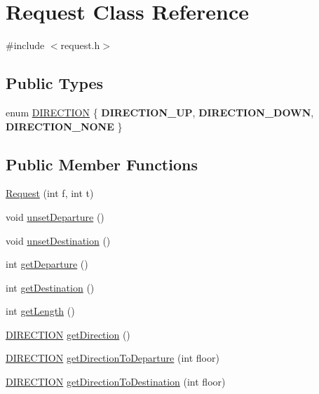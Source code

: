 \hypertarget{class_request}{
\section{Request Class Reference}
\label{class_request}
}


{\ttfamily \#include $<$request.h$>$}

\subsection*{Public Types}
\begin{DoxyCompactItemize}
\item 
enum \hyperlink{class_request_a31872cb7919df688dc6866ea607b9d9d}{DIRECTION} \{ {\bfseries DIRECTION\_\-UP}, 
{\bfseries DIRECTION\_\-DOWN}, 
{\bfseries DIRECTION\_\-NONE}
 \}
\end{DoxyCompactItemize}
\subsection*{Public Member Functions}
\begin{DoxyCompactItemize}
\item 
\hyperlink{class_request_a65d1a250d302018d1211fbdb2b8e0345}{Request} (int f, int t)
\item 
void \hyperlink{class_request_a76a1f5a44df4120828d34a90fbcec13e}{unsetDeparture} ()
\item 
void \hyperlink{class_request_addbd9fdcd5e5a0291c89aad38f6c8416}{unsetDestination} ()
\item 
int \hyperlink{class_request_a7199b71072973cac67be00225bd9ce5b}{getDeparture} ()
\item 
int \hyperlink{class_request_af8586495f2fd5dce9fc5690d47f59310}{getDestination} ()
\item 
int \hyperlink{class_request_a78b24de8cdef27ff340b28d49d251720}{getLength} ()
\item 
\hyperlink{class_request_a31872cb7919df688dc6866ea607b9d9d}{DIRECTION} \hyperlink{class_request_af75b4fec08458a4fe539d679d87ac8c4}{getDirection} ()
\item 
\hyperlink{class_request_a31872cb7919df688dc6866ea607b9d9d}{DIRECTION} \hyperlink{class_request_a7a435c886ed19acb556dc2445a53bd37}{getDirectionToDeparture} (int floor)
\item 
\hyperlink{class_request_a31872cb7919df688dc6866ea607b9d9d}{DIRECTION} \hyperlink{class_request_aeae53642527adaf40498ec5b05921ca0}{getDirectionToDestination} (int floor)
\end{DoxyCompactItemize}
